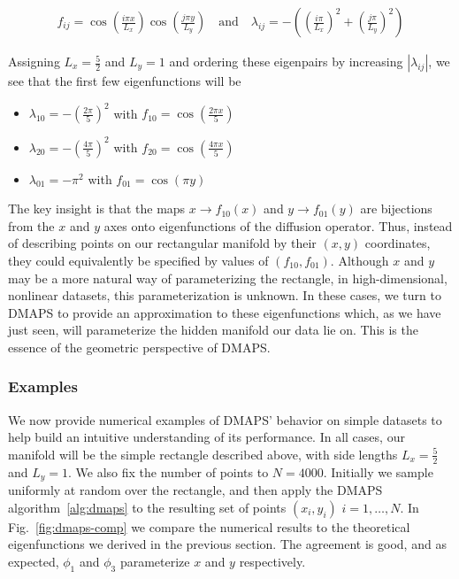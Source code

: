 \begin{align}
  f_{ij} = \cos\left(\frac{i \pi x}{L_x}\right) \cos\left(\frac{j \pi y}{L_y}\right) \quad
  \mathrm{and} \quad \lambda_{ij} = -\left( \left(\frac{i \pi
  }{L_x}\right)^2 + \left(\frac{j \pi}{L_y}\right)^2 \right)
\end{align}

Assigning $L_x = \frac{5}{2}$ and $L_y = 1$ and ordering these eigenpairs by
increasing $|\lambda_{ij}|$, we see that the first few eigenfunctions
will be

\begin{itemize}
\item $\lambda_{10} = -\left(\frac{2 \pi}{5}\right)^2$ with $f_{10} =
  \cos \left(\frac{2 \pi x}{5} \right)$
\item $\lambda_{20} = -\left(\frac{4 \pi}{5}\right)^2$ with $f_{20} =
  \cos \left(\frac{4 \pi x}{5} \right)$
\item $\lambda_{01} = -\pi^2$ with $f_{01} =
  \cos \left( \pi y \right)$
\end{itemize}

The key insight is that the maps $x \rightarrow f_{10} (x)$ and
$y \rightarrow f_{01} (y)$ are bijections from the $x$ and $y$ axes
onto eigenfunctions of the diffusion operator. Thus, instead of
describing points on our rectangular manifold by their $(x,y)$
coordinates, they could equivalently be specified by values of
$(f_{10}, f_{01})$. Although $x$ and $y$ may be a more natural way of
parameterizing the rectangle, in high-dimensional, nonlinear datasets,
this parameterization is unknown. In these cases, we turn to DMAPS to
provide an approximation to these eigenfunctions which, as we have
just seen, will parameterize the hidden manifold our data lie on. This
is the essence of the geometric perspective of DMAPS.

\subsubsection{Examples}

We now provide numerical examples of DMAPS' behavior on simple
datasets to help build an intuitive understanding of its
performance. In all cases, our manifold will be the simple rectangle
described above, with side lengths $L_x = \frac{5}{2}$ and $L_y =
1$. We also fix the number of points to $N = 4000$. Initially we
sample uniformly at random over the rectangle, and then apply the
DMAPS algorithm~\ref{alg:dmaps} to the resulting set of points
$(x_i, y_i)$ $i = 1, \dots, N$. In Fig.~\ref{fig:dmaps-comp} we
compare the numerical results to the theoretical eigenfunctions we
derived in the previous section. The agreement is good, and as
expected, $\phi_1$ and $\phi_3$ parameterize $x$ and $y$
respectively.

